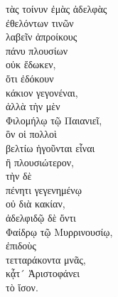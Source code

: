 {\large
\begin{greek}
\noindent τὰς τοίνυν ἐμὰς ἀδελφὰς \\
\tabto{2em} ἐθελόντων τινῶν \\
\tabto{4em} λαβεῖν ἀπροίκους \\
\tabto{2em} πάνυ πλουσίων \\
οὐκ ἔδωκεν, \\
\tabto{2em} ὅτι ἐδόκουν \\
\tabto{4em} κάκιον γεγονέναι, \\
ἀλλὰ τὴν μὲν \\
\tabto{2em} Φιλομήλῳ τῷ Παιανιεῖ, \\
\tabto{4em} ὃν οἱ πολλοὶ \\
\tabto{4em} βελτίω ἡγοῦνται εἶναι\\
\tabto{4em} ἢ πλουσιώτερον, \\
τὴν δὲ \\
\tabto{2em} πένητι γεγενημένῳ \\
\tabto{4em} οὐ διὰ κακίαν, \\
\tabto{2em} ἀδελφιδῷ δὲ ὄντι \\
\tabto{2em} Φαίδρῳ τῷ Μυρρινουσίῳ, \\
ἐπιδοὺς \\
\tabto{2em} τετταράκοντα μνᾶς, \\
κᾆτ´ Ἀριστοφάνει \\
\tabto{2em} τὸ ἴσον.\\

\end{greek}
}

